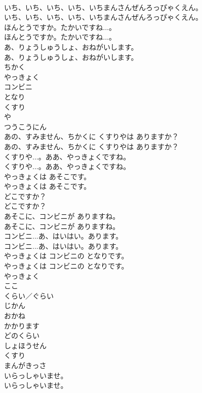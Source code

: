 \documentclass[8pt]{extreport}
\begin{document}
\begin{CJK}{UTF8}{min}
\\	いち、いち、いち、いち、いちまんさんぜんろっぴゃくえん。	
\\	いち、いち、いち、いち、いちまんさんぜんろっぴゃくえん。 
\\	ほんとうですか。たかいですね...。	
\\	ほんとうですか。たかいですね...。 
\\	あ、りょうしゅうしょ、おねがいします。	
\\	あ、りょうしゅうしょ、おねがいします。 
\\	ちかく
\\	やっきょく
\\	コンビニ
\\	となり
\\	くすり
\\	や
\\	つうこうにん
\\	あの、すみません、ちかくに くすりやは ありますか？	
\\	あの、すみません、ちかくに くすりやは ありますか？ 
\\	くすりや...。ああ、やっきょくですね。	
\\	くすりや...。ああ、やっきょくですね。 
\\	やっきょくは あそこです。	
\\	やっきょくは あそこです。 
\\	どこですか？	
\\	どこですか？ 
\\	あそこに、コンビニが ありますね。	
\\	あそこに、コンビニが ありますね。 
\\	コンビニ...あ、はいはい。あります。	
\\	コンビニ...あ、はいはい。あります。 
\\	やっきょくは コンビニの となりです。	
\\	やっきょくは コンビニの となりです。 
\\	やっきょく
\\	ここ
\\	くらい／ぐらい
\\	じかん
\\	おかね
\\	かかります
\\	どのくらい
\\	しょほうせん
\\	くすり
\\	まんがきっさ
\\	いらっしゃいませ。	
\\	いらっしゃいませ。 

\end{CJK}
\end{document}
